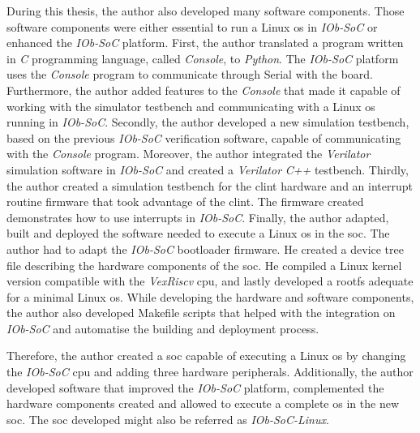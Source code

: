 During this thesis, the author also developed many software components. Those software components were either essential to run a Linux \acrshort{os} in \textit{IOb-SoC} or enhanced the \textit{IOb-SoC} platform. First, the author translated a program written in \textit{C} programming language, called \textit{Console}, to \textit{Python}. The \textit{IOb-SoC} platform uses the \textit{Console} program to communicate through Serial with the board. Furthermore, the author added features to the \textit{Console} that made it capable of working with the simulator testbench and communicating with a Linux \acrshort{os} running in \textit{IOb-SoC}. Secondly, the author developed a new simulation testbench, based on the previous \textit{IOb-SoC} verification software, capable of communicating with the \textit{Console} program. Moreover, the author integrated the \textit{Verilator}~\cite{snyder2010verilator} simulation software in \textit{IOb-SoC} and created a \textit{Verilator} \textit{C++} testbench. Thirdly, the author created a simulation testbench for the \acrshort{clint} hardware and an interrupt routine firmware that took advantage of the \acrshort{clint}. The firmware created demonstrates how to use interrupts in \textit{IOb-SoC}. Finally, the author adapted, built and deployed the software needed to execute a Linux \acrshort{os} in the \acrshort{soc}. The author had to adapt the \textit{IOb-SoC} bootloader firmware. He created a device tree file describing the hardware components of the \acrshort{soc}. He compiled a Linux kernel version compatible with the \textit{VexRiscv} \acrshort{cpu}, and lastly developed a \acrshort{rootfs} adequate for a minimal Linux \acrshort{os}. While developing the hardware and software components, the author also developed Makefile scripts that helped with the integration on \textit{IOb-SoC} and automatise the building and deployment process.

Therefore, the author created a \acrshort{soc} capable of executing a Linux \acrshort{os} by changing the \textit{IOb-SoC} \acrshort{cpu} and adding three hardware peripherals. Additionally, the author developed software that improved the \textit{IOb-SoC} platform, complemented the hardware components created and allowed to execute a complete \acrlong{os} in the new \acrshort{soc}. The \acrshort{soc} developed might also be referred as \textit{IOb-SoC-Linux}.

